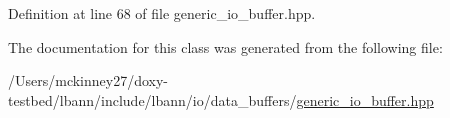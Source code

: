 Definition at line 68 of file generic\+\_\+io\+\_\+buffer.\+hpp.



The documentation for this class was generated from the following file\+:\begin{DoxyCompactItemize}
\item 
/\+Users/mckinney27/doxy-\/testbed/lbann/include/lbann/io/data\+\_\+buffers/\hyperlink{generic__io__buffer_8hpp}{generic\+\_\+io\+\_\+buffer.\+hpp}\end{DoxyCompactItemize}
